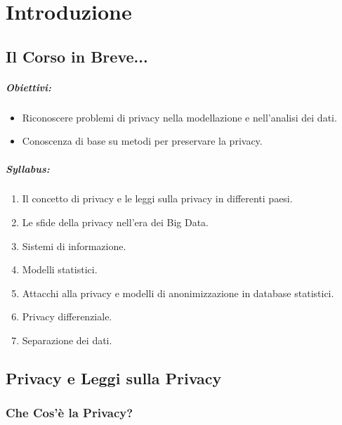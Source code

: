 \chapter{Introduzione}

\section{Il Corso in Breve...}

\paragraph{Obiettivi:}

\begin{itemize}
  \item Riconoscere problemi di privacy nella modellazione e nell'analisi dei dati. 
  \item Conoscenza di base su metodi per preservare la privacy.
\end{itemize}

\paragraph{Syllabus:}

\begin{enumerate}
  \item Il concetto di privacy e le leggi sulla privacy in differenti paesi. 
  \item Le sfide della privacy nell'era dei Big Data. 
  \item Sistemi di informazione. 
  \item Modelli statistici. 
  \item Attacchi alla privacy e modelli di anonimizzazione in database statistici. 
  \item Privacy differenziale. 
  \item Separazione dei dati.
\end{enumerate}

\section{Privacy e Leggi sulla Privacy}

\subsection{Che Cos'è la Privacy?}



